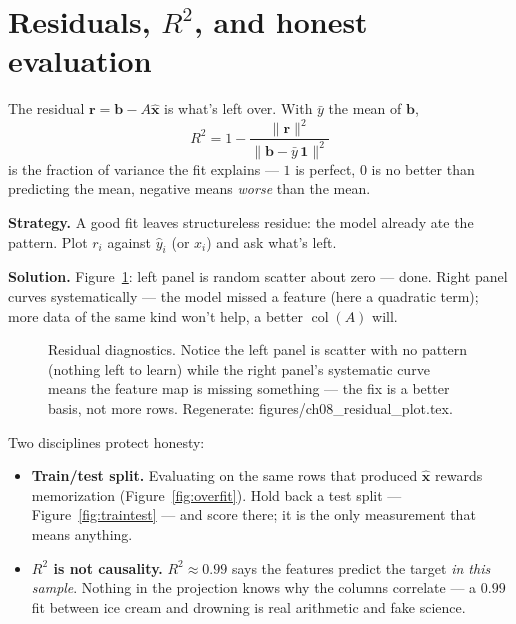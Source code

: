 \section{Residuals, \texorpdfstring{$R^{2}$}{R2}, and honest evaluation}\label{sec:lstsq-eval}

\begin{definition}
The residual $\mathbf r=\mathbf b-A\hat{\mathbf x}$ is what's left over.
With $\bar y$ the mean of $\mathbf b$,
\[
R^{2}=1-\frac{\lVert\mathbf r\rVert^{2}}{\lVert\mathbf b-\bar y\,\mathbf1\rVert^{2}}
\]
is the fraction of variance the fit explains --- $1$ is perfect, $0$ is no
better than predicting the mean, negative means \emph{worse} than the
mean.
\end{definition}

\begin{example}\label{ex:resplot}
\textbf{Strategy.} A good fit leaves structureless residue: the model
already ate the pattern. Plot $r_i$ against $\hat y_i$ (or $x_i$) and ask
what's left.

\textbf{Solution.} Figure~\ref{fig:residplot}: left panel is random
scatter about zero --- done. Right panel curves systematically --- the
model missed a feature (here a quadratic term); more data of the same
kind won't help, a better $\operatorname{col}(A)$ will.
\end{example}

\begin{figure}[htbp]
\centering

\caption{Residual diagnostics. Notice the left panel is scatter with no
pattern (nothing left to learn) while the right panel's systematic curve
means the feature map is missing something --- the fix is a better basis,
not more rows. Regenerate: \ttfamily figures/ch08\_residual\_plot.tex.}
\label{fig:residplot}
\end{figure}

Two disciplines protect honesty:

\begin{itemize}
\item \textbf{Train/test split.} Evaluating on the same rows that produced
$\hat{\mathbf x}$ rewards memorization (Figure~\ref{fig:overfit}).
Hold back a test split --- Figure~\ref{fig:traintest} --- and score there;
it is the only measurement that means anything.
\item \textbf{$R^{2}$ is not causality.} $R^{2}\approx0.99$ says the
features predict the target \emph{in this sample}. Nothing in the
projection knows why the columns correlate --- a $0.99$ fit between ice
cream and drowning is real arithmetic and fake science.
\end{itemize}

